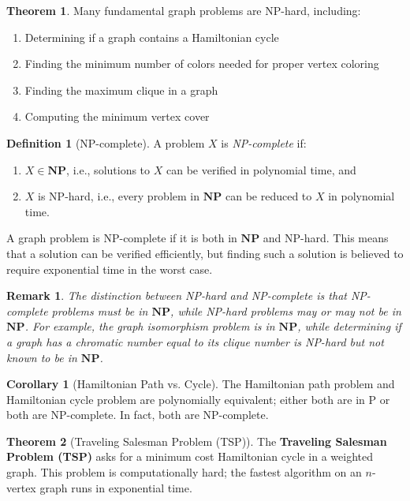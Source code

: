 \documentclass{article}
\newtheorem{remark}{Remark}
\theoremstyle{definition}
\newtheorem{theorem}{Theorem}
\newtheorem{corollary}{Corollary}
\newtheorem{definition}{Definition}
\begin{document}
\begin{theorem}
Many fundamental graph problems are NP-hard, including:
\begin{enumerate}
    \item Determining if a graph contains a Hamiltonian cycle
    \item Finding the minimum number of colors needed for proper vertex coloring
    \item Finding the maximum clique in a graph
    \item Computing the minimum vertex cover
\end{enumerate}
\end{theorem}

\begin{definition}[NP-complete]
A problem $X$ is \emph{NP-complete} if:
\begin{enumerate}
    \item $X \in \mathbf{NP}$, i.e., solutions to $X$ can be verified in polynomial time, and
    \item $X$ is NP-hard, i.e., every problem in $\mathbf{NP}$ can be reduced to $X$ in polynomial time.
\end{enumerate}

A graph problem is NP-complete if it is both in $\mathbf{NP}$ and NP-hard. This means that a solution can be verified efficiently, but finding such a solution is believed to require exponential time in the worst case.
\end{definition}

\begin{remark}
The distinction between NP-hard and NP-complete is that NP-complete problems must be in $\mathbf{NP}$, while NP-hard problems may or may not be in $\mathbf{NP}$. For example, the graph isomorphism problem is in $\mathbf{NP}$, while determining if a graph has a chromatic number equal to its clique number is NP-hard but not known to be in $\mathbf{NP}$.
\end{remark}

\begin{corollary}[Hamiltonian Path vs. Cycle]
The Hamiltonian path problem and Hamiltonian cycle problem are polynomially equivalent; either both are in P or both are NP-complete. In fact, both are NP-complete.
\end{corollary}

\begin{theorem}[Traveling Salesman Problem (TSP)]
The \textbf{Traveling Salesman Problem (TSP)} asks for a minimum cost Hamiltonian cycle in a
weighted graph. This problem is computationally hard; the fastest algorithm on an $n$-vertex graph runs in
exponential time.
\end{theorem}
\end{document}
